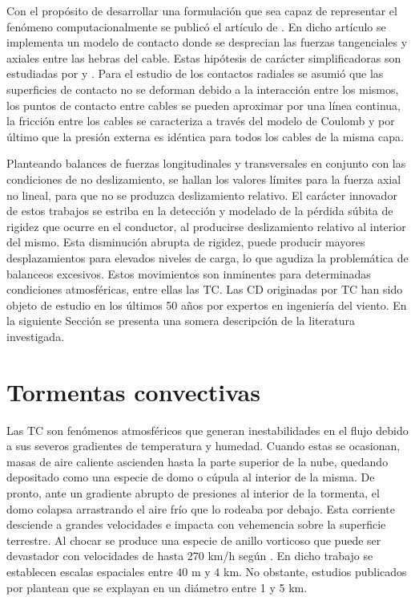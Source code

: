 Con el propósito de desarrollar una formulación que sea capaz de representar el fenómeno computacionalmente se publicó el artículo de \cite{Foti2016}. En dicho artículo se implementa un modelo de contacto donde se desprecian las fuerzas tangenciales y axiales entre las hebras del cable. Estas hipótesis de carácter simplificadoras son estudiadas por \cite{costello1990average} y \cite{rawlins2005flexure}. Para el estudio de los contactos radiales se asumió que las superficies de contacto no se deforman debido a la interacción entre los mismos, los puntos de contacto entre cables se pueden aproximar por una línea continua, la fricción entre los cables se caracteriza a través del modelo de Coulomb y por último que la presión externa es idéntica para todos los cables de la misma capa. 

Planteando balances de fuerzas longitudinales y transversales en conjunto con las condiciones de no deslizamiento, se hallan los valores límites para la fuerza axial no lineal, para que no se produzca deslizamiento relativo. El carácter innovador de estos trabajos se estriba en la detección y modelado de la pérdida súbita de rigidez  que ocurre en el conductor, al producirse deslizamiento relativo al interior del mismo. Esta disminución abrupta de rigidez, puede producir mayores desplazamientos para elevados niveles de carga, lo que agudiza la problemática de balanceos excesivos. Estos movimientos son inminentes para determinadas condiciones atmosféricas, entre ellas las TC. Las CD originadas por TC han sido objeto de estudio en los últimos 50 años por expertos en ingeniería del viento. En la siguiente Sección se presenta una somera descripción de la literatura investigada. 

\section{Tormentas convectivas}\label{Sec:EA:TormentasConvectivas}

Las TC son fenómenos atmosféricos que generan inestabilidades en el flujo debido a sus severos gradientes de temperatura y humedad. Cuando estas se ocasionan, masas de aire caliente ascienden hasta la parte superior de la nube, quedando depositado como una especie de domo o cúpula al interior de la misma. De pronto, ante un gradiente abrupto de presiones al interior de la tormenta, el domo colapsa arrastrando el aire frío que lo rodeaba por debajo. Esta corriente desciende a grandes velocidades e impacta con vehemencia sobre la superficie terrestre. Al chocar se produce una especie de anillo vorticoso que puede ser devastador con velocidades de hasta 270 km/h según \cite{fujita1985downburst}. En dicho trabajo se establecen escalas espaciales entre $40$ m y $4$ km. No obstante, estudios publicados por \cite{darwish2010dynamic} plantean que se explayan en un diámetro entre 1 y 5 km.


